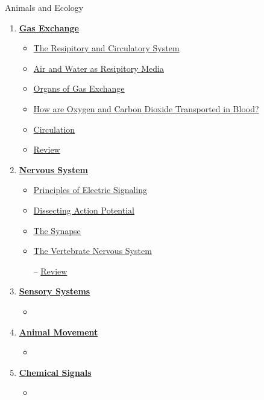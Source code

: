 \documentclass[12pt,letterpaper]{article}
\begin{document}
\begin{chapbox}{Animals and Ecology}
{\begin{enumerate}[font=\bfseries, wide]
    \begin{itemize}
        \item \hyperlink{41.1}{Nutritional Requirements}
        \item \hyperlink{41.3}{How Are Nutrients Digested and Absorbed?}
        \item \hyperlink{41.4}{Nutritional Homeostasis}
        \item \hyperlink{41.r}{Review}
    \end{itemize}
\item \hyperlink{42}{\textbf{Gas Exchange}}
    \begin{itemize}
        \item \hyperlink{42.1}{The Resipitory and Circulatory System}
        \item \hyperlink{42.2}{Air and Water as Resipitory Media}
        \item \hyperlink{42.3}{Organs of Gas Exchange}
        \item \hyperlink{42.4}{How are Oxygen and Carbon Dioxide Transported in Blood?}
        \item \hyperlink{42.5}{Circulation}
        \item \hyperlink{42.r}{Review}
    \end{itemize}
\item \hyperlink{43}{\textbf{Nervous System}}
    \begin{itemize}
        \item \hyperlink{43.1}{Principles of Electric Signaling}
        \item \hyperlink{43.2}{Dissecting Action Potential}
        \item \hyperlink{43.3}{The Synapse}
        \item \hyperlink{43.4}{The Vertebrate Nervous System}
        \item [--] \hyperlink{43.r}{Review}
    \end{itemize}
\item \hyperlink{44}{\textbf{Sensory Systems}}
    \begin{itemize}
        \item 
    \end{itemize}
\item \hyperlink{45}{\textbf{Animal Movement}}
    \begin{itemize}
        \item 
    \end{itemize}
\item \hyperlink{46}{\textbf{Chemical Signals}}
    \begin{itemize}
        \item 
    \end{itemize}
\end{enumerate}
}\end{chapbox}
\end{document}
